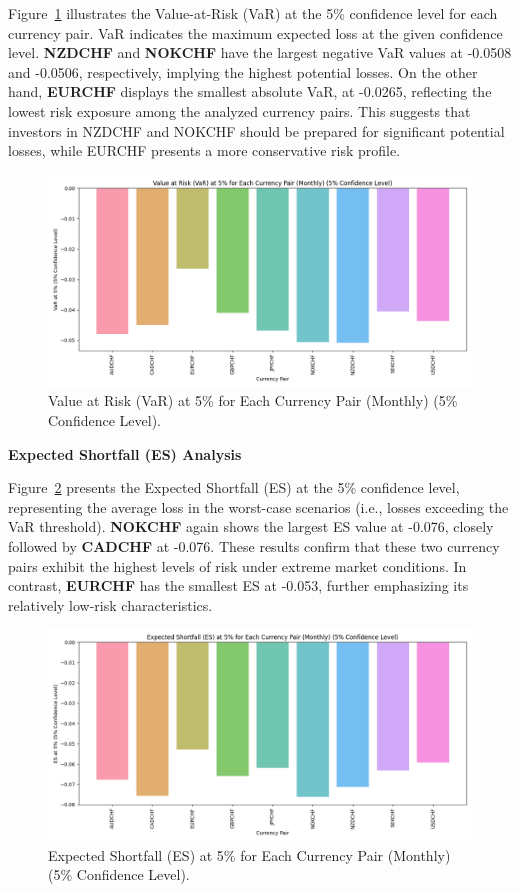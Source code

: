 \documentclass{article}
\begin{document}
Figure~\ref{fig:VaR_plot} illustrates the Value-at-Risk (VaR) at the 5\% confidence level for each currency pair. VaR indicates the maximum expected loss at the given confidence level. \textbf{NZDCHF} and \textbf{NOKCHF} have the largest negative VaR values at -0.0508 and -0.0506, respectively, implying the highest potential losses. On the other hand, \textbf{EURCHF} displays the smallest absolute VaR, at -0.0265, reflecting the lowest risk exposure among the analyzed currency pairs. This suggests that investors in NZDCHF and NOKCHF should be prepared for significant potential losses, while EURCHF presents a more conservative risk profile.

\begin{figure}[H]
    \centering
    \includegraphics[width=0.75\linewidth]{../../reports/figures/VaR_5_percent_plot.png}
    \caption{Value at Risk (VaR) at 5\% for Each Currency Pair (Monthly) (5\% Confidence Level).}
    \label{fig:VaR_plot}
\end{figure}

\textbf{Expected Shortfall (ES) Analysis}

Figure~\ref{fig:ES_plot} presents the Expected Shortfall (ES) at the 5\% confidence level, representing the average loss in the worst-case scenarios (i.e., losses exceeding the VaR threshold). \textbf{NOKCHF} again shows the largest ES value at -0.076, closely followed by \textbf{CADCHF} at -0.076. These results confirm that these two currency pairs exhibit the highest levels of risk under extreme market conditions. In contrast, \textbf{EURCHF} has the smallest ES at -0.053, further emphasizing its relatively low-risk characteristics.

\begin{figure}[H]
    \centering
    \includegraphics[width=0.75\linewidth]{../../reports/figures/ES_5_percent_plot.png}
    \caption{Expected Shortfall (ES) at 5\% for Each Currency Pair (Monthly) (5\% Confidence Level).}
    \label{fig:ES_plot}
\end{figure}
\end{document}
